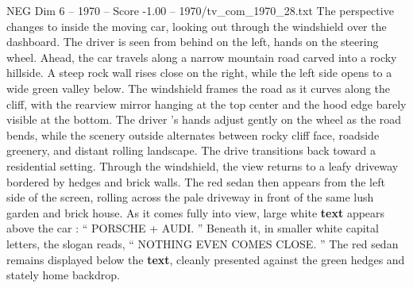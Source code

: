 \begin{textsample}{NEG Dim 6 – 1970 – Score -1.00 – 1970/tv\_com\_1970\_28.txt}
The perspective changes to inside the moving car, looking out through the windshield over the dashboard.
The driver is seen from behind on the left, hands on the steering wheel.
Ahead, the car travels along a narrow mountain road carved into a rocky hillside.
A steep rock wall rises close on the right, while the left side opens to a wide green valley below.
The windshield frames the road as it curves along the cliff, with the rearview mirror hanging at the top center and the hood edge barely visible at the bottom.
The driver ’s hands adjust gently on the wheel as the road bends, while the scenery outside alternates between rocky cliff face, roadside greenery, and distant rolling landscape.
The drive transitions back toward a residential setting.
Through the windshield, the view returns to a leafy driveway bordered by hedges and brick walls.
The red sedan then appears from the left side of the screen, rolling across the pale driveway in front of the same lush garden and brick house.
As it comes fully into view, large white \textbf{text} appears above the car : “ PORSCHE + AUDI. ” Beneath it, in smaller white capital letters, the slogan reads, “ NOTHING EVEN COMES CLOSE. ” The red sedan remains displayed below the \textbf{text}, cleanly presented against the green hedges and stately home backdrop.

\end{textsample}
